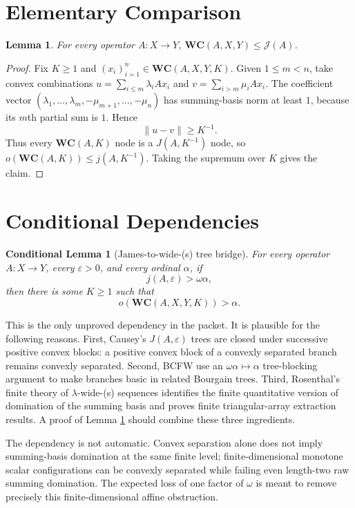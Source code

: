 \documentclass[11pt]{article}
\newtheorem{lemma}{Lemma}
\newtheorem{conditional}{Conditional Lemma}
\theoremstyle{definition}
\newcommand{\WC}{\mathbf{WC}}
\newcommand{\J}{\mathcal{J}}
\begin{document}
\section{Elementary Comparison}

\begin{lemma}\label{wc-le-j}
For every operator $A:X\to Y$, $\WC(A,X,Y)\leq \J(A)$.
\end{lemma}

\begin{proof}
Fix $K\geq 1$ and $(x_i)_{i=1}^n\in \WC(A,X,Y,K)$.  Given
$1\leq m<n$, take convex combinations
$u=\sum_{i\leq m}\lambda_i Ax_i$ and
$v=\sum_{i>m}\mu_i Ax_i$.  The coefficient vector
$(\lambda_1,\ldots,\lambda_m,-\mu_{m+1},\ldots,-\mu_n)$ has summing-basis
norm at least $1$, because its $m$th partial sum is $1$.  Hence
\[
  \|u-v\|\geq K^{-1}.
\]
Thus every $\WC(A,K)$ node is a $J(A,K^{-1})$ node, so
$o(\WC(A,K))\leq j(A,K^{-1})$.  Taking the supremum over $K$ gives the claim.
\end{proof}

\section{Conditional Dependencies}

\begin{conditional}[James-to-wide-(s) tree bridge]\label{bridge}
For every operator $A:X\to Y$, every $\varepsilon>0$, and every ordinal
$\alpha$, if
\[
  j(A,\varepsilon)>\omega\alpha,
\]
then there is some $K\geq 1$ such that
\[
  o(\WC(A,X,Y,K))>\alpha.
\]
\end{conditional}

This is the only unproved dependency in the packet.  It is plausible for the
following reasons.  First, Causey's $J(A,\varepsilon)$ trees are closed under
successive positive convex blocks: a positive convex block of a convexly
separated branch remains convexly separated.  Second, BCFW use an
$\omega\alpha\mapsto\alpha$ tree-blocking argument to make branches basic in
related Bourgain trees.  Third, Rosenthal's finite theory of
$\lambda$-wide-(s) sequences \cite{RosenthalWideS} identifies the finite
quantitative version of domination of the summing basis and proves finite
triangular-array extraction results.  A proof of Lemma \ref{bridge} should
combine these three ingredients.

The dependency is not automatic.  Convex separation alone does not imply
summing-basis domination at the same finite level; finite-dimensional monotone
scalar configurations can be convexly separated while failing even length-two
raw summing domination.  The expected loss of one factor of $\omega$ is meant
to remove precisely this finite-dimensional affine obstruction.
\end{document}
